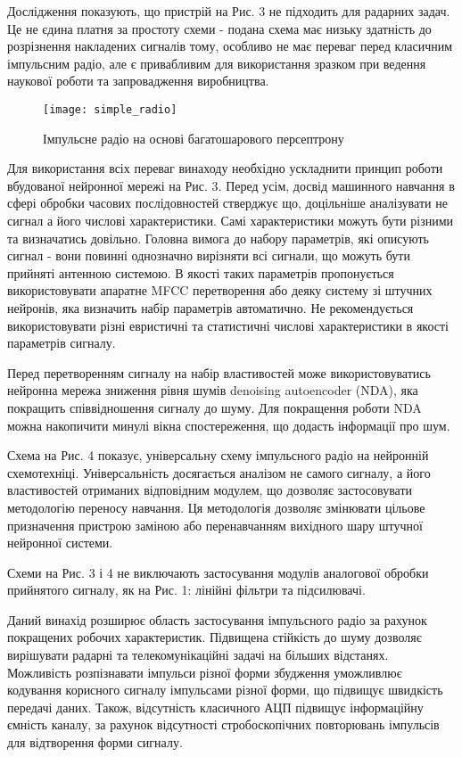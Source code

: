 Дослідження показують, що пристрій на Рис. 3 не підходить для радарних 
задач. Це не єдина платня за простоту схеми - подана схема має низьку 
здатність до розрізнення накладених сигналів тому, особливо не має 
переваг перед класичним імпульсним радіо, але є привабливим для 
використання зразком при ведення наукової роботи та запровадження 
виробництва.

\begin{figure}[htbp] \begin{center}
\texttt{[image: simple\_radio]}
\caption{Імпульсне радіо на основі багатошарового персептрону} 
\label{fig:mp_radio}
\end{center} \end{figure}

Для використання всіх переваг винаходу необхідно ускладнити принцип 
роботи вбудованої нейронної мережі на Рис. 3. Перед усім, досвід 
машинного навчання в сфері обробки часових послідовностей стверджує що, 
доцільніше аналізувати не сигнал а його числові характеристики. 
Самі характеристики можуть бути різними та визначатись довільно. 
Головна вимога до набору параметрів, які описують сигнал - вони повинні 
однозначно вирізняти всі сигнали, що можуть бути прийняті антенною 
системою. В якості таких параметрів пропонується використовувати 
апаратне MFCC перетворення або деяку систему зі штучних нейронів, 
яка визначить набір параметрів автоматично. Не рекомендується 
використовувати різні евристичні та статистичні числові 
характеристики в якості параметрів сигналу.

Перед перетворенням сигналу на набір властивостей може використовуватись 
нейронна мережа зниження рівня шумів denoising autoencoder (NDA), 
яка покращить співвідношення сигналу до шуму. Для покращення роботи 
NDA можна накопичити минулі вікна спостереження, що додасть 
інформації про шум.

Схема на Рис. 4 показує, універсальну схему імпульсного радіо на 
нейронній схемотехніці. Універсальність досягається аналізом не самого 
сигналу, а його властивостей отриманих відповідним модулем, що дозволяє 
застосовувати методологію переносу навчання. Ця методологія дозволяє 
змінювати цільове призначення пристрою заміною або перенавчанням 
вихідного шару штучної нейронної системи.

Схеми на Рис. 3 і 4 не виключають застосування модулів аналогової 
обробки прийнятого сигналу, як на Рис. 1: лінійні фільтри 
та підсилювачі.

Даний винахід розширює область застосування імпульсного радіо за 
рахунок покращених робочих характеристик. Підвищена стійкість до 
шуму дозволяє вирішувати радарні та телекомунікаційні задачі на 
більших відстанях. Можливість розпізнавати імпульси різної форми 
збудження уможливлює кодування корисного сигналу імпульсами різної форми, 
що підвищує швидкість передачі даних. Також, відсутність класичного АЦП 
підвищує інформаційну ємність каналу, за рахунок відсутності 
стробоскопічних повторювань імпульсів для відтворення форми сигналу.

